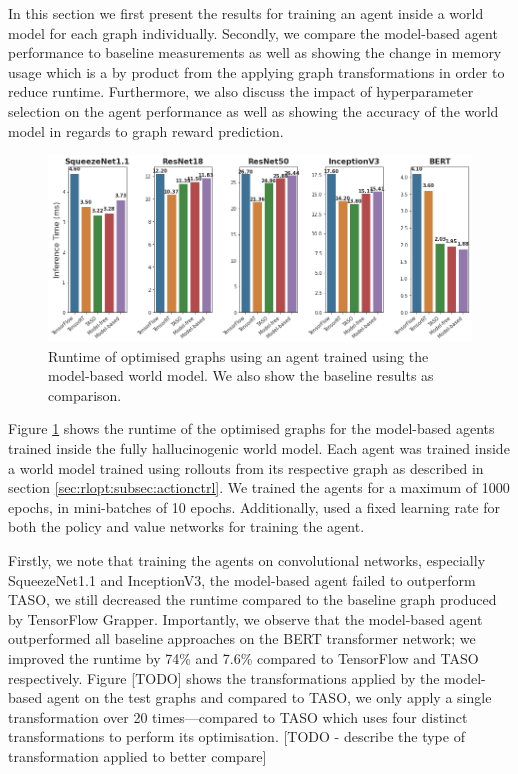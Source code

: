 In this section we first present the results for training an agent inside a world model for each graph individually. Secondly, we compare the model-based agent performance to baseline measurements as well as showing the change in memory usage which is a by product from the applying graph transformations in order to reduce runtime. Furthermore, we also discuss the impact of hyperparameter selection on the agent performance as well as showing the accuracy of the world model in regards to graph reward prediction.

\begin{figure}[ht]
  \centering
  \includegraphics[width=1\columnwidth]{sections/5evaluation/images/runtimes_all.png}
  \caption[Runtimes of optimised graphs using a model-based controller]{Runtime of optimised graphs using an agent trained using the model-based world model. We also show the baseline results as comparison.}
  \label{fig:eval:world-model-runtimes}
\end{figure}

Figure \ref{fig:eval:world-model-runtimes} shows the runtime of the optimised graphs for the model-based agents trained inside the fully hallucinogenic world model. Each agent was trained inside a world model trained using rollouts from its respective graph as described in section \ref{sec:rlopt:subsec:actionctrl}. We trained the agents for a maximum of 1000 epochs, in mini-batches of 10 epochs. Additionally, used a fixed learning rate for both the policy and value networks for training the agent.

Firstly, we note that training the agents on convolutional networks, especially SqueezeNet1.1 and InceptionV3, the model-based agent failed to outperform TASO, we still decreased the runtime compared to the baseline graph produced by TensorFlow Grapper. Importantly, we observe that the model-based agent outperformed all baseline approaches on the BERT transformer network; we improved the runtime by 74\% and 7.6\% compared to TensorFlow and TASO respectively. Figure [TODO] shows the transformations applied by the model-based agent on the test graphs and compared to TASO, we only apply a single transformation over 20 times---compared to TASO which uses four distinct transformations to perform its optimisation. [TODO - describe the type of transformation applied to better compare]

